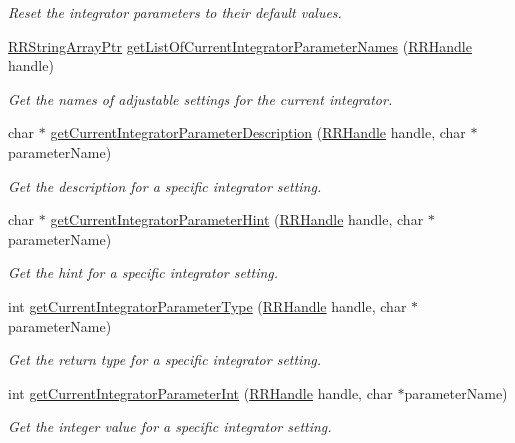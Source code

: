 \begin{DoxyCompactItemize}
\begin{DoxyCompactList}\small\item\em Reset the integrator parameters to their default values. \end{DoxyCompactList}\item 
\hyperlink{rrc__types_8h_a7c9475df6c7337d99482b13a365e7596}{R\+R\+String\+Array\+Ptr} \hyperlink{group__simopts_ga8bc1ea6950f141d40373416d64abaefa}{get\+List\+Of\+Current\+Integrator\+Parameter\+Names} (\hyperlink{rrc__types_8h_a1d68f0592372208fa5a5f2799ea4b3ae}{R\+R\+Handle} handle)
\begin{DoxyCompactList}\small\item\em Get the names of adjustable settings for the current integrator. \end{DoxyCompactList}\item 
char $\ast$ \hyperlink{group__simopts_gae4308a0893d84e49ef877d2db65d110c}{get\+Current\+Integrator\+Parameter\+Description} (\hyperlink{rrc__types_8h_a1d68f0592372208fa5a5f2799ea4b3ae}{R\+R\+Handle} handle, char $\ast$parameter\+Name)
\begin{DoxyCompactList}\small\item\em Get the description for a specific integrator setting. \end{DoxyCompactList}\item 
char $\ast$ \hyperlink{group__simopts_ga4cc4c3b42b58f7ce266cff67cbc79c85}{get\+Current\+Integrator\+Parameter\+Hint} (\hyperlink{rrc__types_8h_a1d68f0592372208fa5a5f2799ea4b3ae}{R\+R\+Handle} handle, char $\ast$parameter\+Name)
\begin{DoxyCompactList}\small\item\em Get the hint for a specific integrator setting. \end{DoxyCompactList}\item 
int \hyperlink{group__simopts_ga04f015cae3234d1e24dc86c4ca6cf7ab}{get\+Current\+Integrator\+Parameter\+Type} (\hyperlink{rrc__types_8h_a1d68f0592372208fa5a5f2799ea4b3ae}{R\+R\+Handle} handle, char $\ast$parameter\+Name)
\begin{DoxyCompactList}\small\item\em Get the return type for a specific integrator setting. \end{DoxyCompactList}\item 
int \hyperlink{group__simopts_ga23b63638fae7a4823ac503474126c85b}{get\+Current\+Integrator\+Parameter\+Int} (\hyperlink{rrc__types_8h_a1d68f0592372208fa5a5f2799ea4b3ae}{R\+R\+Handle} handle, char $\ast$parameter\+Name)
\begin{DoxyCompactList}\small\item\em Get the integer value for a specific integrator setting. \end{DoxyCompactList}\item 

\end{DoxyCompactItemize}
